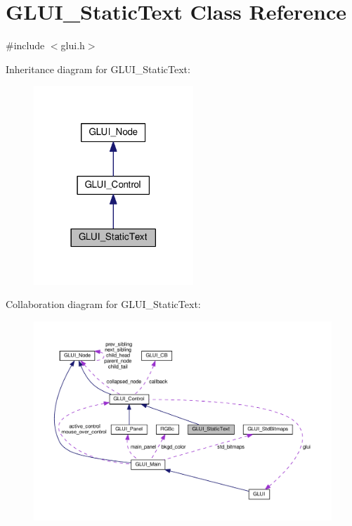 \hypertarget{class_g_l_u_i___static_text}{\section{G\+L\+U\+I\+\_\+\+Static\+Text Class Reference}
\label{class_g_l_u_i___static_text}
}


{\ttfamily \#include $<$glui.\+h$>$}



Inheritance diagram for G\+L\+U\+I\+\_\+\+Static\+Text\+:\nopagebreak
\begin{figure}[H]
\begin{center}
\leavevmode
\includegraphics[width=170pt]{class_g_l_u_i___static_text__inherit__graph}
\end{center}
\end{figure}


Collaboration diagram for G\+L\+U\+I\+\_\+\+Static\+Text\+:\nopagebreak
\begin{figure}[H]
\begin{center}
\leavevmode
\includegraphics[width=350pt]{class_g_l_u_i___static_text__coll__graph}
\end{center}
\end{figure}
